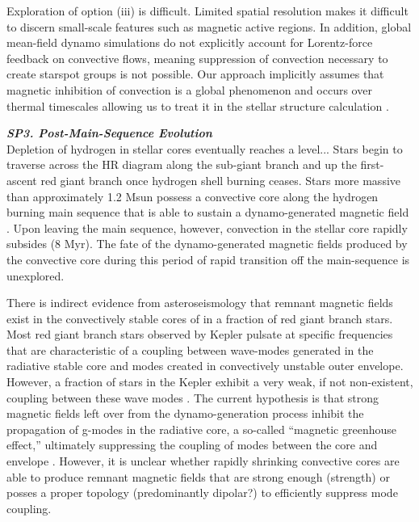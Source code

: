\documentclass[12pt,a4paper]{article}
\begin{document}
Exploration of option (iii) is difficult. Limited spatial resolution makes it difficult to discern small-scale features such as magnetic active regions. In addition, global mean-field dynamo simulations do not explicitly account for Lorentz-force feedback on convective flows, meaning suppression of convection necessary to create starspot groups is not possible. Our approach implicitly assumes that magnetic inhibition of convection is a global phenomenon and occurs over thermal timescales allowing us to treat it in the stellar structure calculation \citep{FC12b}.


\textbf{\textit{SP3. Post-Main-Sequence Evolution}} \\
Depletion of hydrogen in stellar cores eventually reaches a level... Stars begin to traverse across the HR diagram along the sub-giant branch and up the first-ascent red giant branch once hydrogen shell burning ceases. Stars more massive than approximately 1.2 Msun possess a convective core along the hydrogen burning main sequence that is able to sustain a dynamo-generated magnetic field \citep[e.g.,][]{Browning2004,Featherstone2009,Augustson2016}. Upon leaving the main sequence, however, convection in the stellar core rapidly subsides (8 Myr). The fate of the dynamo-generated magnetic fields produced by the convective core during this period of rapid transition off the main-sequence is unexplored. 

There is indirect evidence from asteroseismology that remnant magnetic fields exist in the convectively stable cores of in a fraction of red giant branch stars. Most red giant branch stars observed by Kepler pulsate at specific frequencies that are characteristic of a coupling between wave-modes generated in the radiative stable core and modes created in convectively unstable outer envelope. However, a fraction of stars in the Kepler exhibit a very weak, if not non-existent, coupling between these wave modes \citep{Fuller2015}. The current hypothesis is that strong magnetic fields left over from the dynamo-generation process inhibit the propagation of g-modes in the radiative core, a so-called ``magnetic greenhouse effect,'' ultimately suppressing the coupling of modes between the core and envelope \citep{Fuller2015, Cantiello2016}. However, it is unclear whether rapidly shrinking convective cores are able to produce remnant magnetic fields that are strong enough (strength) or posses a proper topology (predominantly dipolar?) to efficiently suppress mode coupling. 
\end{document}
